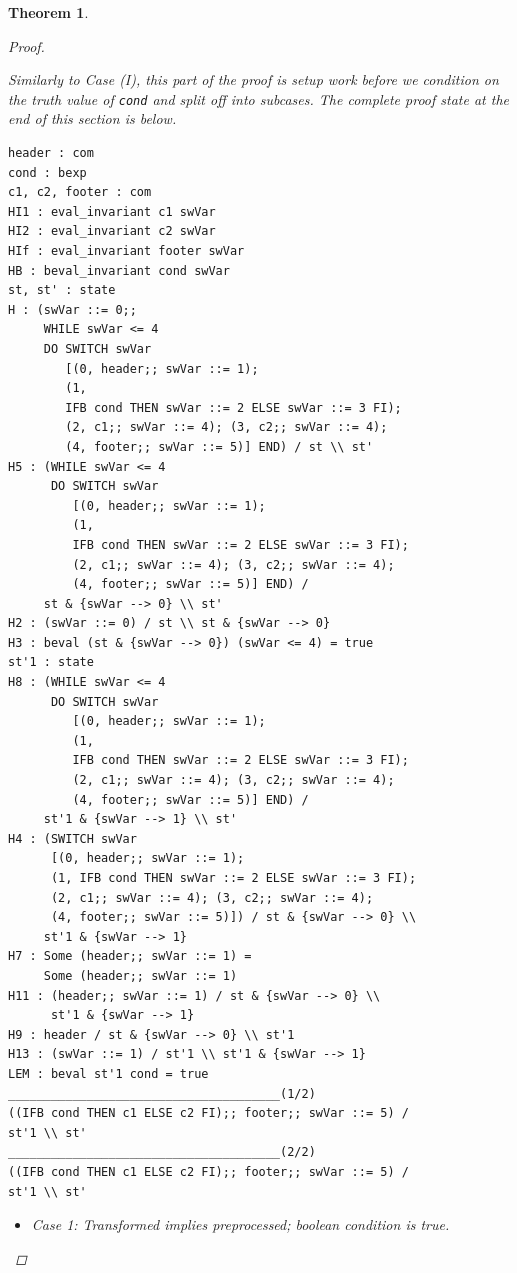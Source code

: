 \documentclass[12pt,notitlepage]{report}
\theoremstyle{plain}
\newtheorem{theo}{Theorem}[section]
\theoremstyle{definition}
\numberwithin{equation}{section}
\begin{document}
\begin{theo}
\begin{proof}
\begin{itemize}
            Similarly to Case (I), this part of the proof is setup work before we condition on the truth value of \verb$cond$ and split off into subcases.  The complete proof state at the end of this section is below.
\begin{verbatim}
header : com
cond : bexp
c1, c2, footer : com
HI1 : eval_invariant c1 swVar
HI2 : eval_invariant c2 swVar
HIf : eval_invariant footer swVar
HB : beval_invariant cond swVar
st, st' : state
H : (swVar ::= 0;;
     WHILE swVar <= 4
     DO SWITCH swVar
        [(0, header;; swVar ::= 1);
        (1,
        IFB cond THEN swVar ::= 2 ELSE swVar ::= 3 FI);
        (2, c1;; swVar ::= 4); (3, c2;; swVar ::= 4);
        (4, footer;; swVar ::= 5)] END) / st \\ st'
H5 : (WHILE swVar <= 4
      DO SWITCH swVar
         [(0, header;; swVar ::= 1);
         (1,
         IFB cond THEN swVar ::= 2 ELSE swVar ::= 3 FI);
         (2, c1;; swVar ::= 4); (3, c2;; swVar ::= 4);
         (4, footer;; swVar ::= 5)] END) /
     st & {swVar --> 0} \\ st'
H2 : (swVar ::= 0) / st \\ st & {swVar --> 0}
H3 : beval (st & {swVar --> 0}) (swVar <= 4) = true
st'1 : state
H8 : (WHILE swVar <= 4
      DO SWITCH swVar
         [(0, header;; swVar ::= 1);
         (1,
         IFB cond THEN swVar ::= 2 ELSE swVar ::= 3 FI);
         (2, c1;; swVar ::= 4); (3, c2;; swVar ::= 4);
         (4, footer;; swVar ::= 5)] END) /
     st'1 & {swVar --> 1} \\ st'
H4 : (SWITCH swVar
      [(0, header;; swVar ::= 1);
      (1, IFB cond THEN swVar ::= 2 ELSE swVar ::= 3 FI);
      (2, c1;; swVar ::= 4); (3, c2;; swVar ::= 4);
      (4, footer;; swVar ::= 5)]) / st & {swVar --> 0} \\
     st'1 & {swVar --> 1}
H7 : Some (header;; swVar ::= 1) =
     Some (header;; swVar ::= 1)
H11 : (header;; swVar ::= 1) / st & {swVar --> 0} \\
      st'1 & {swVar --> 1}
H9 : header / st & {swVar --> 0} \\ st'1
H13 : (swVar ::= 1) / st'1 \\ st'1 & {swVar --> 1}
LEM : beval st'1 cond = true
______________________________________(1/2)
((IFB cond THEN c1 ELSE c2 FI);; footer;; swVar ::= 5) /
st'1 \\ st'
______________________________________(2/2)
((IFB cond THEN c1 ELSE c2 FI);; footer;; swVar ::= 5) /
st'1 \\ st'\end{verbatim}
            \begin{itemize}
                \item[(II.i)] Case 1: Transformed implies preprocessed; boolean condition is true.
                

\end{itemize}
\end{itemize}
\end{proof}
\end{theo}
\end{document}
